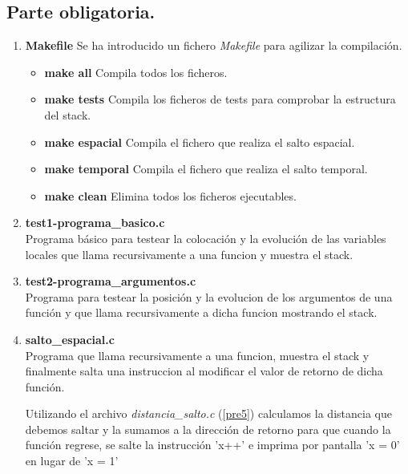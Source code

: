 \documentclass[12pt,a4paper,titlepage]{article}
\begin{document}
\subsection{Parte obligatoria.}
  \begin{enumerate}

       
    \item \textbf{Makefile} \label{pre0}
Se ha introducido un fichero \emph{Makefile} para agilizar la compilación. 

      \begin{itemize}

	  \item \textbf{make all}
	  Compila todos los ficheros.

          \item \textbf{make tests}
          Compila los ficheros de tests para comprobar la estructura del stack.

          \item \textbf{make espacial}
	  Compila el fichero que realiza el salto espacial.

          \item \textbf{make temporal}
	  Compila el fichero que realiza el salto temporal.

          \item \textbf{make clean}
	  Elimina todos los ficheros ejecutables.

      \end{itemize}

  \item \textbf{test1-programa\_basico.c} \label{pre1}
  \\
Programa básico para testear la colocación y la evolución de las variables locales
que llama recursivamente a una funcion y muestra el stack.  


  \item \textbf{test2-programa\_argumentos.c} \label{pre2}
  \\
Programa para testear la posición y la evolucion de los argumentos de una función y que 
llama recursivamente a dicha funcion mostrando el stack.


  \item \textbf{salto\_espacial.c} \label{pre3} 
  \\
Programa que llama recursivamente a una funcion, muestra el stack y finalmente salta
una instruccion al modificar el valor de retorno de dicha función.

Utilizando el archivo \emph{distancia\_salto.c} (\ref{pre5}) calculamos la distancia que
debemos saltar y la sumamos a la dirección de retorno para que cuando la función regrese, 
se salte la instrucción 'x++' e imprima por pantalla 'x = 0' en lugar de 'x = 1' 



\end{enumerate}
\end{document}
